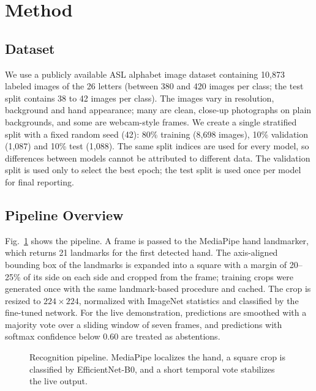 \documentclass[conference]{IEEEtran}
\begin{document}
\section{Method}
\label{sec:method}

\subsection{Dataset}
We use a publicly available ASL alphabet image dataset containing 10{,}873 labeled images of the 26 letters (between 380 and 420 images per class; the test split contains 38 to 42 images per class). The images vary in resolution, background and hand appearance; many are clean, close-up photographs on plain backgrounds, and some are webcam-style frames. We create a single stratified split with a fixed random seed (42): 80\% training (8{,}698 images), 10\% validation (1{,}087) and 10\% test (1{,}088). The same split indices are used for every model, so differences between models cannot be attributed to different data. The validation split is used only to select the best epoch; the test split is used once per model for final reporting.

\subsection{Pipeline Overview}
Fig.~\ref{fig:pipeline} shows the pipeline. A frame is passed to the MediaPipe hand landmarker, which returns 21 landmarks for the first detected hand. The axis-aligned bounding box of the landmarks is expanded into a square with a margin of 20--25\% of its side on each side and cropped from the frame; training crops were generated once with the same landmark-based procedure and cached. The crop is resized to $224\times224$, normalized with ImageNet statistics and classified by the fine-tuned network. For the live demonstration, predictions are smoothed with a majority vote over a sliding window of seven frames, and predictions with softmax confidence below 0.60 are treated as abstentions.

\begin{figure}[t]
\centering
{}
\caption{Recognition pipeline. MediaPipe localizes the hand, a square crop is classified by EfficientNet-B0, and a short temporal vote stabilizes the live output.}
\label{fig:pipeline}
\end{figure}
\end{document}

